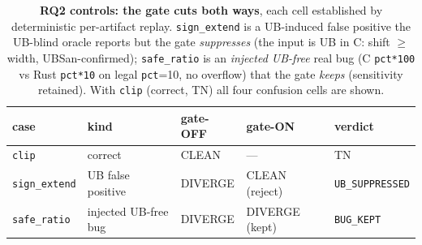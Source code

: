 \begin{table}[t]
  \centering
  \caption{\textbf{RQ2 controls: the gate cuts both ways}, each cell established by
    deterministic per-artifact replay. \texttt{sign\_extend} is a UB-induced false
    positive the UB-blind oracle reports but the gate \emph{suppresses} (the input
    is UB in C: shift $\ge$ width, UBSan-confirmed); \texttt{safe\_ratio} is an
    \emph{injected UB-free} real bug (C \texttt{pct*100} vs Rust \texttt{pct*10} on
    legal \texttt{pct}=10, no overflow) that the gate \emph{keeps} (sensitivity
    retained). With \texttt{clip} (correct, TN) all four confusion cells are shown.}
  \label{tab:rq2-controls}
  \begin{tabular}{l l l l l}
    \toprule
    case & kind & gate-OFF & gate-ON & verdict \\
    \midrule
    \texttt{clip}         & correct              & CLEAN   & ---            & TN \\
    \texttt{sign\_extend} & UB false positive    & DIVERGE & CLEAN (reject) & \texttt{UB\_SUPPRESSED} \\
    \texttt{safe\_ratio}  & injected UB-free bug  & DIVERGE & DIVERGE (kept) & \texttt{BUG\_KEPT} \\
    \bottomrule
  \end{tabular}
\end{table}
